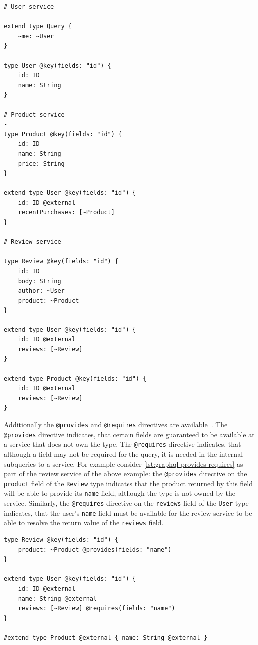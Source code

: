 \begin{lstlisting}[language=graphqls, caption={Concern-based Separation with Apollo Federation~\cite{MDG}}, label={lst:graphql-concern-separation}]
# User service --------------------------------------------------------
extend type Query {
    ~me: ~User
}

type User @key(fields: "id") {
    id: ID
    name: String
}

# Product service -----------------------------------------------------
type Product @key(fields: "id") {
    id: ID
    name: String
    price: String
}

extend type User @key(fields: "id") {
    id: ID @external
    recentPurchases: [~Product]
}

# Review service ------------------------------------------------------
type Review @key(fields: "id") {
    id: ID
    body: String
    author: ~User
    product: ~Product
}

extend type User @key(fields: "id") {
    id: ID @external
    reviews: [~Review]
}

extend type Product @key(fields: "id") {
    id: ID @external
    reviews: [~Review]
}
\end{lstlisting}

Additionally the \texttt{@provides} and \texttt{@requires} directives are available~\cite{MDGa}.
The \texttt{@provides} directive indicates, that certain fields are guaranteed to be available at a service that does not own the type.
The \texttt{@requires} directive indicates, that although a field may not be required for the query, it is needed in the internal subqueries to a service.
For example consider \autoref{lst:graphql-provides-requires} as part of the review service of the above example: the \texttt{@provides} directive on the \texttt{product} field of the \texttt{Review} type indicates that the product returned by this field will be able to provide its \texttt{name} field, although the type is not owned by the service.
Similarly, the \texttt{@requires} directive on the \texttt{reviews} field of the \texttt{User} type indicates, that the user's \texttt{name} field must be available for the review service to be able to resolve the return value of the \texttt{reviews} field.

\begin{lstlisting}[caption={\texttt{@provides} and \texttt{@requires} Directives of Apollo Federation~\cite{MDG}}, language=graphqls, label={lst:graphql-provides-requires}]
type Review @key(fields: "id") {
    product: ~Product @provides(fields: "name")
}

extend type User @key(fields: "id") {
    id: ID @external
    name: String @external
    reviews: [~Review] @requires(fields: "name")
}

#extend type Product @external { name: String @external }
\end{lstlisting}

